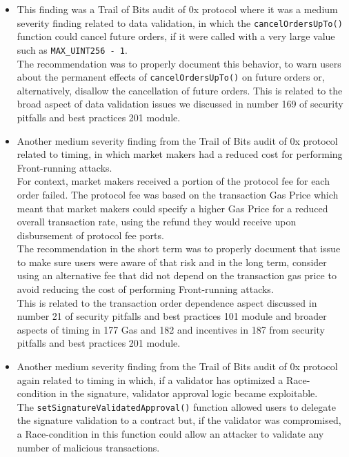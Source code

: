 \begin{itemize}
\item
  This finding was a Trail of Bits audit of 0x protocol where it was a
  medium severity finding related to data validation, in which the
  \texttt{cancelOrdersUpTo()} function could cancel future orders, if it
  were called with a very large value such as
  \texttt{MAX\_UINT256\ -\ 1}.\\

  The recommendation was to properly document this behavior, to warn
  users about the permanent effects of \texttt{cancelOrdersUpTo()} on
  future orders or, alternatively, disallow the cancellation of future
  orders. This is related to the broad aspect of data validation issues
  we discussed in number 169 of security pitfalls and best practices 201
  module.
\item
  Another medium severity finding from the Trail of Bits audit of 0x
  protocol related to timing, in which market makers had a reduced cost
  for performing Front-running attacks.\\

  For context, market makers received a portion of the protocol fee for
  each order failed. The protocol fee was based on the transaction Gas
  Price which meant that market makers could specify a higher Gas Price
  for a reduced overall transaction rate, using the refund they would
  receive upon disbursement of protocol fee ports.\\

  The recommendation in the short term was to properly document that
  issue to make sure users were aware of that risk and in the long term,
  consider using an alternative fee that did not depend on the
  transaction gas price to avoid reducing the cost of performing
  Front-running attacks.\\

  This is related to the transaction order dependence aspect discussed
  in number 21 of security pitfalls and best practices 101 module and
  broader aspects of timing in 177 Gas and 182 and incentives in 187
  from security pitfalls and best practices 201 module.
\item
  Another medium severity finding from the Trail of Bits audit of 0x
  protocol again related to timing in which, if a validator has
  optimized a Race-condition in the signature, validator approval logic
  became exploitable.\\

  The \texttt{setSignatureValidatedApproval()} function allowed users to
  delegate the signature validation to a contract but, if the validator
  was compromised, a Race-condition in this function could allow an
  attacker to validate any number of malicious transactions.\\


\end{itemize}
